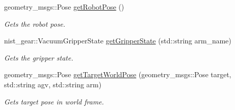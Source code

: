 \begin{DoxyCompactItemize}
geometry\+\_\+msgs\+::\+Pose \hyperlink{classGantryControl_aefa12231efd7960bc201638f832d9478}{get\+Robot\+Pose} ()
\begin{DoxyCompactList}\small\item\em Gets the robot pose. \end{DoxyCompactList}\item 
nist\+\_\+gear\+::\+Vacuum\+Gripper\+State \hyperlink{classGantryControl_a986691834604135cf47b1c070f8d915e}{get\+Gripper\+State} (std\+::string arm\+\_\+name)
\begin{DoxyCompactList}\small\item\em Gets the gripper state. \end{DoxyCompactList}\item 
geometry\+\_\+msgs\+::\+Pose \hyperlink{classGantryControl_ae92c2fdeba302399425c1abafc76f973}{get\+Target\+World\+Pose} (geometry\+\_\+msgs\+::\+Pose target, std\+::string agv, std\+::string arm)
\begin{DoxyCompactList}\small\item\em Gets target pose in world frame. \end{DoxyCompactList}\end{DoxyCompactItemize}
